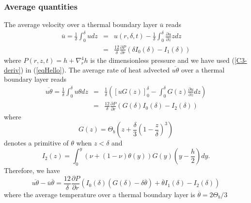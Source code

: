   \subsubsection{Average quantities}
  The average  velocity over  a thermal boundary  layer $\overline{u}$
  reads
  \begin{eqnarray}
    \overline{u}        =\frac{1}{\delta}\int_0^{\delta}udz        &=&
                                                                       u(r,\delta,t) - \frac{1}{\delta}\int_0^{\delta}\frac{\partial
                                                                       u}{\partial
                                                                       z}
                                                                       zdz\label{eqHello}\\
                                                                   &=&\frac{12}{\delta}
                                                                       \frac{\partial
                                                                       P}{\partial
                                                                       r}\left(\delta
                                                                       I_0(\delta)-I_1(\delta)\right)
  \end{eqnarray}
  where $P(r,z,t) = h+\nabla_r^4h$ is  the dimensionless pressure and we
  have used (\ref{C3-deriv}) in  (\ref{eqHello}).  The average rate of
  heat advected 
  $\overline{u\theta}$ over a thermal boundary layer reads
  \begin{eqnarray}
    \overline{u\theta}=\frac{1}{\delta}\int_0^{\delta}u\theta dz &=& \frac{1}{\delta}\left( [ uG(z) ]_{0}^{\delta} -\int_0^\delta
                                                                     G(z)\frac{\partial
                                                                     u}{\partial
                                                                     z}
                                                                     dz\right)\nonumber\\
                                                                 &=&\frac{12}{\delta} \frac{\partial P}{\partial r}\left(G(\delta)I_0(\delta)-I_2(\delta)\right)
  \end{eqnarray}
  where
  \begin{equation}
    G(z)                  =                 \Theta_b\left(                  z
      +\frac{\delta}{3}\left(1-\frac{z}{\delta}\right)^3\right)
  \end{equation}
  denotes a primitive of $\theta$ when $z<\delta$ and
  \begin{equation}
    I_2(z)=\int_0^y\left(\nu+(1-\nu)\theta(y)\right)G(y)
    \left(y-\frac{h}{2}\right)dy.
    \label{I_3}
  \end{equation}
  Therefore, we have
  \begin{equation}
    \overline{u\theta}-\overline{u}\overline{\theta}= \frac{12}{\delta} \frac{\partial P}{\partial r}\left(I_0(\delta)\left(G(\delta)-\delta\overline{\theta}\right)+\overline{\theta}I_1(\delta)-I_2(\delta)\right)
  \end{equation} 
  where  the average  temperature  over a  thermal  boundary layer  is
  $ \overline{\theta} = 2\Theta_{b}/3$

